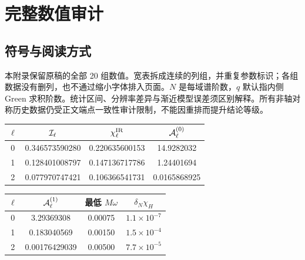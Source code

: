 \documentclass[UTF8,fontset=fandol,12pt,a4paper,oneside,openany]{ctexrep}
\begin{document}
\chapter{完整数值审计}
\section*{符号与阅读方式}
本附录保留原稿的全部 20 组数值。宽表拆成连续的列组，并重复参数标识；各组数据没有删列，也不通过缩小字体排入页面。$N$ 是每域谱阶数，$q$ 默认指内侧 Green 求积阶数。统计区间、分辨率差异与渐近模型误差须区别解释。所有非轴对称历史数据仍受正文端点一致性审计限制，不能因重排而提升结论等级。
\par\addvspace{14pt}
\noindent\begin{minipage}{\linewidth}
\captionsetup{type=table}\caption{轴对称红外解析系数与复视界振幅检验。}\label{audit:tab:axisymmetric-infrared}
\centering\fontsize{10.5}{14}\selectfont
\setlength{\tabcolsep}{6pt}\renewcommand{\arraystretch}{1.2}
\par{}\par\smallskip
\begin{tabular}{cccc}\toprule
$\ell$ & ${\cal I}_\ell$ & $\chi^{\rm IR}_\ell$ & ${\cal A}^{(0)}_\ell$\\\midrule
0 & 0.346573590280 & 0.220635600153 & 14.9282032\\
1 & 0.128401008797 & 0.147136717786 & 1.24401694\\
2 & 0.077970747421 & 0.106366541731 & 0.0165868925\\
\bottomrule\end{tabular}
\par\medskip
\par{}\par\smallskip
\begin{tabular}{cccc}\toprule
$\ell$ & ${\cal A}^{(1)}_\ell$ & 最低 $M\omega$ & $\delta_N\chi_H$\\\midrule
0 & 3.29369308 & 0.00075 & $1.1\times10^{-7}$\\
1 & 0.183040569 & 0.00150 & $1.5\times10^{-4}$\\
2 & 0.00176429039 & 0.00500 & $7.7\times10^{-5}$\\
\bottomrule\end{tabular}
\end{minipage}\par\addvspace{10pt}
\par\addvspace{14pt}
\end{document}
